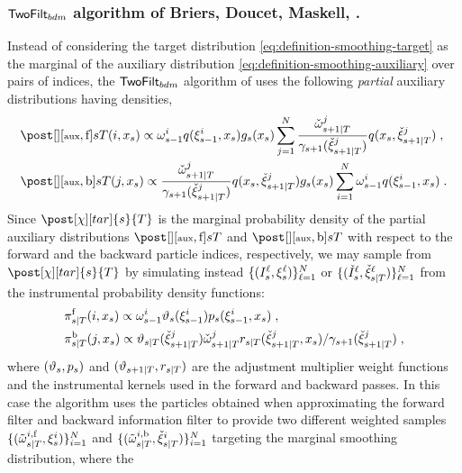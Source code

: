 \subsubsection{$\mathsf{TwoFilt}_{bdm}$ algorithm of Briers, Doucet, Maskell, \cite{briers:doucet:maskell:2010}.}
Instead of considering the target distribution \eqref{eq:definition-smoothing-target} as the marginal of the auxiliary distribution \eqref{eq:definition-smoothing-auxiliary}
over pairs of indices, the $\mathsf{TwoFilt}_{bdm}$ algorithm of  \cite{briers:doucet:maskell:2010} uses the following \emph{partial} auxiliary distributions having densities,
\begin{align*}
& \post[][\aux,\mathrm{f}]{s}{T}(i,x_s) \propto  \ewght{s-1}{i} q(\epart{s-1}{i}, x_s) g_s(x_s) \sum_{j=1}^N \frac{\ebackwght{s+1}{T}{j}}{\gamma_{s+1}(\ebackpart{s+1}{T}{j})} q(x_s, \ebackpart{s+1}{T}{j}) \eqsp,\\
& \post[][\aux, \mathrm{b}]{s}{T}(j,x_s) \propto  \frac{\ebackwght{s+1}{T}{j}}{\gamma_{s+1}(\ebackpart{s+1}{T}{j})} q(x_s, \ebackpart{s+1}{T}{j}) g_s(x_s) \sum_{i=1}^N \ewght{s-1}{i} q(\epart{s-1}{i},x_s) \eqsp.
\end{align*}
Since $\post[\Xinit][tar]{s}{T}$ is the marginal probability density of the partial auxiliary distributions $\post[][\aux,\mathrm{f}]{s}{T}$ and $\post[][\aux,\mathrm{b}]{s}{T}$ with respect to the forward and the backward particle indices, respectively, we may sample from $\post[\Xinit][tar]{s}{T}$ by simulating instead $\{(I_s^\ell,\xi_{s}^{\ell}) \}_{\ell=1}^N$ or $\{(\check{I}_{s}^\ell,{\check{\xi}}_{s|T}^{\ell}) \}_{\ell=1}^N$ from the instrumental probability density functions:
\begin{align*}
&\instrpostaux{s}{T}^{\mathrm{f}}(i,x_s) \propto  \ewght{s-1}{i} \adjfuncforward{s}(\epart{s-1}{i}) \kissforward{s}{s}(\epart{s-1}{i}, x_s) \eqsp, \\
&\instrpostaux{s}{T}^{\mathrm{b}}(j,x_s) \propto  \adjfunc{s}{T}{\ebackpart{s+1}{T}{j}} \ebackwght{s+1}{T}{j} \kiss{s}{T}(\ebackpart{s+1}{T}{j}, x_s)/\gamma_{s+1}(\ebackpart{s+1}{T}{j}) \eqsp,
\end{align*}
where $(\adjfuncforward{s},\kissforward{s}{s})$ and $(\adjfunc{s+1}{T}{},\kiss{s}{T})$ are the adjustment multiplier weight functions and the instrumental kernels used in the forward and backward passes. In this case the algorithm uses the particles obtained when approximating the forward filter and backward information filter to provide two different weighted samples
$\{ (\tilde{\omega}_{s|T}^{i,\mathrm{f}}, \xi_{s}^{i}) \}_{i=1}^N$ and $\{ (\tilde{\omega}_{s|T}^{i,\mathrm{b}}, {\check{\xi}}_{s|T}^{i}) \}_{i=1}^N$ targeting the marginal smoothing distribution, where the
